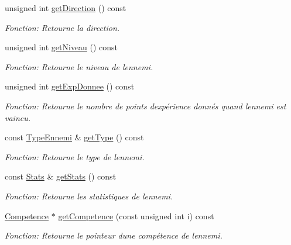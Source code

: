 \begin{DoxyCompactItemize}
unsigned int \mbox{\hyperlink{classEnnemi_a950afe7b7e0bc6b5b9d184b08805f1af}{get\+Direction}} () const
\begin{DoxyCompactList}\small\item\em Fonction\+: Retourne la direction. \end{DoxyCompactList}\item 
unsigned int \mbox{\hyperlink{classEnnemi_a84cb0911005eb3a3775e64b04a744e87}{get\+Niveau}} () const
\begin{DoxyCompactList}\small\item\em Fonction\+: Retourne le niveau de l\textquotesingle{}ennemi. \end{DoxyCompactList}\item 
unsigned int \mbox{\hyperlink{classEnnemi_a3122b2cdbe87622758a576ca17ee15be}{get\+Exp\+Donnee}} () const
\begin{DoxyCompactList}\small\item\em Fonction\+: Retourne le nombre de points d\textquotesingle{}expérience donnés quand l\textquotesingle{}ennemi est vaincu. \end{DoxyCompactList}\item 
const \mbox{\hyperlink{structTypeEnnemi}{Type\+Ennemi}} \& \mbox{\hyperlink{classEnnemi_ac11c0baf4e19f8359da983360f1d6766}{get\+Type}} () const
\begin{DoxyCompactList}\small\item\em Fonction\+: Retourne le type de l\textquotesingle{}ennemi. \end{DoxyCompactList}\item 
const \mbox{\hyperlink{structStats}{Stats}} \& \mbox{\hyperlink{classEnnemi_a6d8d8be2e6e98b036d7256ec733190ba}{get\+Stats}} () const
\begin{DoxyCompactList}\small\item\em Fonction\+: Retourne les statistiques de l\textquotesingle{}ennemi. \end{DoxyCompactList}\item 
\mbox{\hyperlink{structCompetence}{Competence}} $\ast$ \mbox{\hyperlink{classEnnemi_a9c7e7595dc73c4f21c0693a54cac4d7f}{get\+Competence}} (const unsigned int i) const
\begin{DoxyCompactList}\small\item\em Fonction\+: Retourne le pointeur d\textquotesingle{}une compétence de l\textquotesingle{}ennemi. \end{DoxyCompactList}\item 
\mbox{\label{classEnnemi_abd07d8cc39e2a2922813a5023207db49}} 

\end{DoxyCompactItemize}
